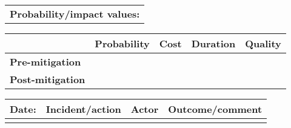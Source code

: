 \begin{table}
\begin{tabularx}{\textwidth}{| X |}
		\hline
		\textbf{Probability/impact values:} \\
	\end{tabularx}
	\begin{tabularx}{\textwidth}{| l | l | X | X | X |}
		\hline
		 &  \textbf{Probability} & \textbf{Cost} & \textbf{Duration} & \textbf{Quality} \\ \hline
		\textbf{Pre-mitigation} & & & & \\ \hline
		\textbf{Post-mitigation} & & & & \\ \hline \hline
	\end{tabularx}
	\begin{tabularx}{\textwidth}{| l | X | l | X |}
		\hline
		\textbf{Date:} & \textbf{Incident/action} & \textbf{Actor} & \textbf{Outcome/comment} \\ \hline
		 &  &  &  \\ \hline
	\end{tabularx}
\end{table}

